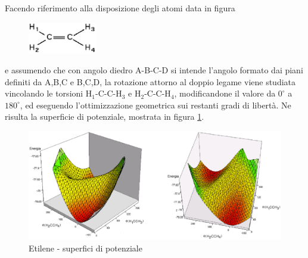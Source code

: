 Facendo riferimento alla disposizione degli atomi data in figura
\begin{figure}[ht]
\begin{center}
\includegraphics[angle=0,width=3cm,keepaspectratio]{immagini/etene/etene.eps}
\end{center}
\end{figure}
e assumendo che con angolo diedro A-B-C-D si intende l'angolo formato dai
piani definiti da A,B,C e B,C,D, la rotazione attorno al doppio legame 
viene studiata vincolando le torsioni H$_1$-C-C-H$_3$ e H$_2$-C-C-H$_4$, 
modificandone il valore da $0^{\circ}$ a $180^{\circ}$, ed eseguendo
l'ottimizzazione geometrica sui restanti gradi di libert\`a. Ne risulta
la superficie di potenziale, mostrata in figura \ref{fig:etene_3d}.

\begin{figure}[ht]
\begin{center}
\includegraphics[angle=0,width=12cm,keepaspectratio]{immagini/etene/3d.eps}
\caption{\small Etilene - superfici di potenziale}
\label{fig:etene_3d}
\end{center}
\end{figure}

